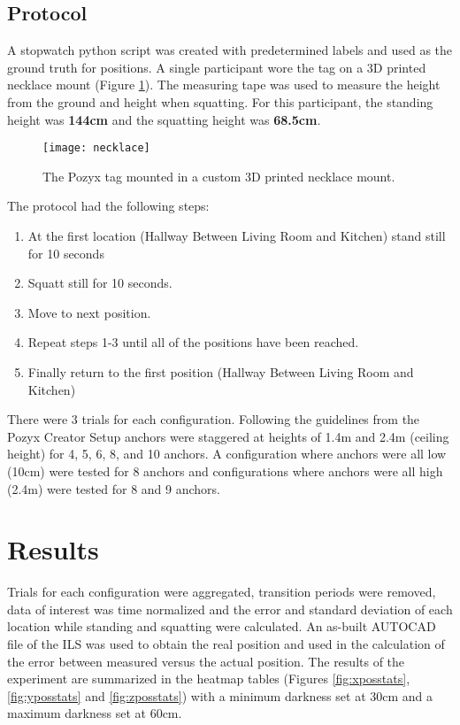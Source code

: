 \clearpage
\subsection{Protocol}
A stopwatch python script was created with predetermined labels and used as the ground truth 
for positions. A single participant wore the tag on a 3D printed necklace mount (Figure \ref{fig:necklace}). 
The measuring tape was used to measure the height from the ground and height when squatting.
For this participant, the standing height was \textbf{144cm} and the squatting height was \textbf{68.5cm}.

\begin{figure}[ht]
    \centering
    \texttt{[image: necklace]}
    \caption{The Pozyx tag mounted in a custom 3D printed necklace mount.}
    \label{fig:necklace}
\end{figure}

The protocol had the following steps:
\begin{enumerate}
    \item At the first location (Hallway Between Living Room and Kitchen) stand still for 10 seconds
    \item Squatt still for 10 seconds.
    \item Move to next position.
    \item Repeat steps 1-3 until all of the positions have been reached.
    \item Finally return to the first position (Hallway Between Living Room and Kitchen)
\end{enumerate}

There were 3 trials for each configuration. Following the guidelines from 
the Pozyx Creator Setup \cite{noauthor_configuration_nodate} anchors were 
staggered at heights of 1.4m and 2.4m (ceiling height) for 4, 5, 6, 8, and 10 anchors.
A configuration where anchors were all low (10cm) were tested for 8 anchors and configurations
where anchors were all high (2.4m) were tested for 8 and 9 anchors.

\section{Results}
Trials for each configuration were aggregated, transition periods were removed, 
data of interest was time normalized and the error and standard deviation of each
location while standing and squatting were calculated. An as-built AUTOCAD file of the 
ILS was used to obtain the real position and used in the calculation of the error 
between measured versus the actual position. The results of the experiment are summarized
in the heatmap tables (Figures \ref{fig:xposstats}, \ref{fig:yposstats} and \ref{fig:zposstats}) 
with a minimum darkness set at 30cm and a maximum darkness set at 60cm.

